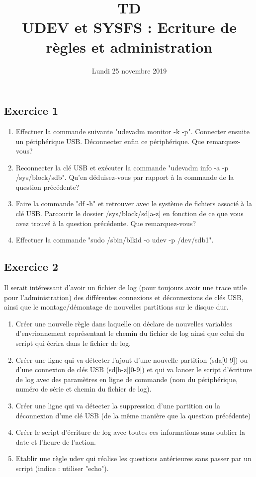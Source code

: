 \documentclass[11pt]{article}
\title{\huge{\textbf {TD} \\UDEV et SYSFS : Ecriture de règles et administration}}
\date{Lundi 25 novembre 2019}
\begin{document}
\maketitle

\subsection*{Exercice 1}

\begin{enumerate}
	\item Effectuer la commande suivante "udevadm monitor -k -p". Connecter ensuite un périphérique USB. Déconnecter enfin ce périphérique. Que remarquez-vous? 
	
	\item Reconnecter la clé USB et exécuter la commande "udevadm info -a -p /sys/block/sdb". Qu'en déduisez-vous par rapport à la commande de la question précédente? 
	
	\item Faire la commande "df -h" et retrouver avec le système de fichiers associé à la clé USB. 
	Parcourir le dossier /sys/block/sd[a-z] en fonction de ce que vous avez trouvé à la question précédente. Que remarquez-vous?
	
	\item Effectuer la commande "sudo /sbin/blkid -o udev -p /dev/sdb1". 
	
\end{enumerate}

\subsection*{Exercice 2}

Il serait intéressant d'avoir un fichier de log (pour toujours avoir une trace utile pour l'administration) 
des différentes connexions et déconnexions de clés USB, ainsi que le montage/démontage de nouvelles partitions
sur le disque dur. 

\begin{enumerate}
	\item Créer une nouvelle règle dans laquelle on déclare de nouvelles variables d'envrionnement représentant le 
	chemin du fichier de log ainsi que celui du script qui écrira dans le fichier de log. 
	\item Créer une ligne qui va détecter l'ajout d'une nouvelle partition (sda[0-9]) ou d'une connexion de clés USB (sd[b-z][0-9])
	et qui va lancer le script d'écriture de log avec des paramètres en ligne de commande (nom du périphérique, numéro de série et chemin du fichier de log).
	\item Créer une ligne qui va détecter la suppression d'une partition ou la déconnexion d'une clé USB (de la même manière que la question précédente)
	
	\item Créer le script d'écriture de log avec toutes ces informations sans oublier la date et l'heure de l'action.
	
	\item Etablir une règle udev qui réalise les questions antérieures sans passer par un script (indice : utiliser "echo").

\end{enumerate}
\end{document}

